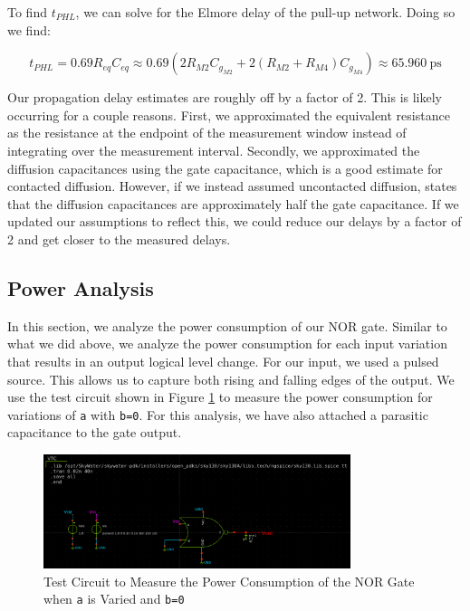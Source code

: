 \documentclass[fleqn]{article}
\begin{document}
	\noindent To find $t_{PHL}$, we can solve for the Elmore delay of the pull-up network. Doing so we find:
	
	\begin{equation}
		t_{PHL} = 0.69R_{eq}C_{eq} \approx 0.69(2R_{M2}C_{g_{M2}} + 2(R_{M2} + R_{M4})C_{g_{M4}})\approx 65.960\ \text{ps}
	\end{equation}
	
	\noindent Our propagation delay estimates are roughly off by a factor of 2. This is likely occurring for a couple reasons. First, we approximated the equivalent resistance as the resistance at the endpoint of the measurement window instead of integrating over the measurement interval. Secondly, we approximated the diffusion capacitances using the gate capacitance, which is a good estimate for contacted diffusion. However, if we instead assumed uncontacted diffusion, \cite{cmos_vlsi_design} states that the diffusion capacitances are approximately half the gate capacitance. If we updated our assumptions to reflect this, we could reduce our delays by a factor of 2 and get closer to the measured delays.
	
	\subsection{Power Analysis}
	
	In this section, we analyze the power consumption of our NOR gate. Similar to what we did above, we analyze the power consumption for each input variation that results in an output logical level change. For our input, we used a pulsed source. This allows us to capture both rising and falling edges of the output. We use the test circuit shown in Figure \ref{fig::nor_power_test_sweep_va} to measure the power consumption for variations of \texttt{a} with \texttt{b=0}. For this analysis, we have also attached a parasitic capacitance to the gate output.
	
	\begin{figure}[H]
		\centerline{\includegraphics[width=0.8\textwidth]{nor_power_test_sweep_va.png}}
		\caption{Test Circuit to Measure the Power Consumption of the NOR Gate when \texttt{a} is Varied and \texttt{b=0}}
		\label{fig::nor_power_test_sweep_va}
	\end{figure}
	
\end{document}
